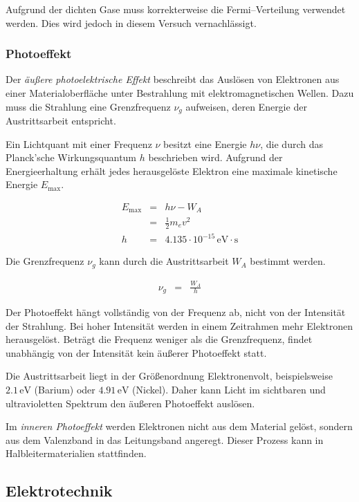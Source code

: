 \documentclass[12pt,a4paper]{scrartcl}
\numberwithin{equation}{section} %
\begin{document}
\noindent
Aufgrund der dichten Gase muss korrekterweise die Fermi--Verteilung verwendet werden. \cite{Gerthsen} Dies wird jedoch in diesem Versuch vernachlässigt.

\subsubsection{Photoeffekt}
Der \emph{äußere photoelektrische Effekt} beschreibt das Auslösen von Elektronen aus einer Materialoberfläche unter Bestrahlung mit elektromagnetischen Wellen. Dazu muss die Strahlung eine Grenzfrequenz $\nu_g$ aufweisen, deren Energie der Austrittsarbeit entspricht.

Ein Lichtquant mit einer Frequenz $\nu$ besitzt eine Energie $h\nu$, die durch das Planck'sche Wirkungsquantum $h$ beschrieben wird. Aufgrund der Energieerhaltung erhält jedes herausgelöste Elektron eine maximale kinetische Energie $E_\mathrm{max}$.

\begin{eqnarray}
	E_\mathrm{max} &=& h\nu - W_A \\
		&=& \frac{1}{2} m_e v^2 \\
	h &=& 4.135 \cdot 10^{-15} \mathrm{\,eV \cdot s}
\end{eqnarray}

\noindent
Die Grenzfrequenz $\nu_g$ kann durch die Austrittsarbeit $W_A$ bestimmt werden.

\begin{eqnarray}
	\nu_g &=& \frac{W_A}{h}
\end{eqnarray}

\noindent
Der Photoeffekt hängt vollständig von der Frequenz ab, nicht von der Intensität der Strahlung. Bei hoher Intensität werden in einem Zeitrahmen mehr Elektronen herausgelöst. Beträgt die Frequenz weniger als die Grenzfrequenz, findet unabhängig von der Intensität kein äußerer Photoeffekt statt.

Die Austrittsarbeit liegt in der Größenordnung Elektronenvolt, beispielsweise $2.1\mathrm{\,eV}$ (Barium) oder $4.91\mathrm{\,eV}$ (Nickel). \cite{Demtröder} Daher kann Licht im sichtbaren und ultravioletten Spektrum den äußeren Photoeffekt auslösen.

Im \emph{inneren Photoeffekt} werden Elektronen nicht aus dem Material gelöst, sondern aus dem Valenzband in das Leitungsband angeregt. Dieser Prozess kann in Halbleitermaterialien stattfinden.

\subsection{Elektrotechnik}
\end{document}
